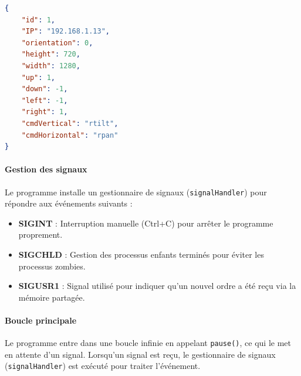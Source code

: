 \documentclass[a4paper, 11pt, french]{article}
\begin{document}
\begin{lstlisting}[language=json, caption={Fichier json pour partager la caméra active, \texttt{cameraActive.json}}, label={lst:cameraActive}]
{
    "id": 1, 
    "IP": "192.168.1.13", 
    "orientation": 0, 
    "height": 720, 
    "width": 1280, 
    "up": 1, 
    "down": -1, 
    "left": -1, 
    "right": 1, 
    "cmdVertical": "rtilt", 
    "cmdHorizontal": "rpan"
}
\end{lstlisting}

\paragraph{Gestion des signaux}
Le programme installe un gestionnaire de signaux (\texttt{signalHandler}) pour répondre aux événements suivants :
\begin{itemize}
    \item \textbf{SIGINT} : Interruption manuelle (Ctrl+C) pour arrêter le programme proprement.
    \item \textbf{SIGCHLD} : Gestion des processus enfants terminés pour éviter les processus zombies.
    \item \textbf{SIGUSR1} : Signal utilisé pour indiquer qu'un nouvel ordre a été reçu via la mémoire partagée.
\end{itemize}

\paragraph{Boucle principale}
Le programme entre dans une boucle infinie en appelant \texttt{pause()}, ce qui le met en attente d'un signal. Lorsqu'un signal est reçu, le gestionnaire de signaux (\texttt{signalHandler}) est exécuté pour traiter l'événement.
\end{document}
